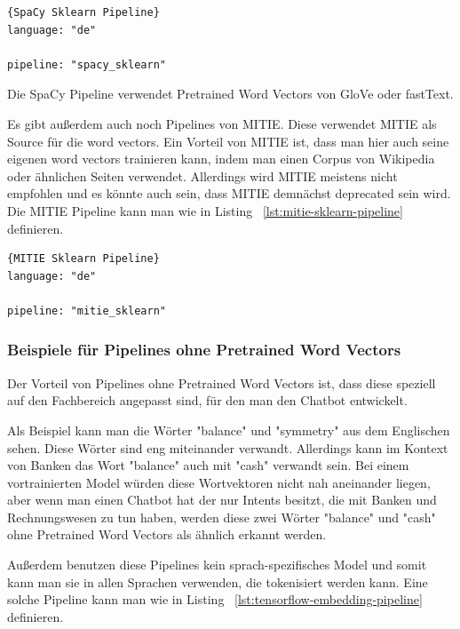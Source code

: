 \begin{lstlisting}[label={lst:spacy-sklearn-pipeline},caption={SpaCy Sklearn Pipeline}]{SpaCy Sklearn Pipeline}
language: "de"

pipeline: "spacy_sklearn"
\end{lstlisting}

Die SpaCy Pipeline verwendet Pretrained Word Vectors von GloVe oder fastText.\cite{spacySklearnPipeline, spacyNLP, rasaMasterclassPreConfiguredPipelines}

Es gibt außerdem auch noch Pipelines von MITIE.
Diese verwendet MITIE als Source für die word vectors.
Ein Vorteil von MITIE ist, dass man hier auch seine eigenen word vectors trainieren kann, indem man einen Corpus von Wikipedia oder ähnlichen Seiten verwendet.
Allerdings wird MITIE meistens nicht empfohlen und es könnte auch sein, dass MITIE demnächst deprecated sein wird.
Die MITIE Pipeline kann man wie in Listing ~\ref{lst:mitie-sklearn-pipeline} definieren.\cite{mitieNLP, mitieDeprecated}

\begin{lstlisting}[label={lst:mitie-sklearn-pipeline},caption={MITIE Sklearn Pipeline}]{MITIE Sklearn Pipeline}
language: "de"

pipeline: "mitie_sklearn"
\end{lstlisting}

\subsubsection{Beispiele für Pipelines ohne Pretrained Word Vectors}

Der Vorteil von Pipelines ohne Pretrained Word Vectors ist, dass diese speziell auf den Fachbereich angepasst sind, für den man den Chatbot entwickelt.\cite{pretrainedVsSupervised, tensorFlowEmbedding}

Als Beispiel kann man die Wörter "balance" und "symmetry" aus dem Englischen sehen.
Diese Wörter sind eng miteinander verwandt.
Allerdings kann im Kontext von Banken das Wort "balance" auch mit "cash" verwandt sein.
Bei einem vortrainierten Model würden diese Wortvektoren nicht nah aneinander liegen, aber wenn man einen Chatbot hat der nur Intents besitzt, die mit Banken und Rechnungswesen zu tun haben, werden diese zwei Wörter "balance" und "cash" ohne Pretrained Word Vectors als ähnlich erkannt werden.\cite{tensorFlowEmbedding}

Außerdem benutzen diese Pipelines kein sprach-spezifisches Model und somit kann man sie in allen Sprachen verwenden, die tokenisiert werden kann.
Eine solche Pipeline kann man wie in Listing ~\ref{lst:tensorflow-embedding-pipeline} definieren.\cite{tensorFlowEmbedding}

